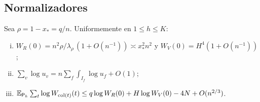 \subsection{Normalizadores}

\begin{lema}\label{lem:normalizadores}
Sea $\rho=1-x_*=q/n$. Uniformemente en $1\le h\le K$:
\begin{enumerate}[(i)]
\item $W_R(0)=n^2\rho/\lambda_\rho\,(1+O(n^{-1}))\asymp x_*^2n^2$ y $W_V(0)=H^4(1+O(n^{-1}))$;
\item $\sum_v\log u_v=n\sum_f\int_{I_f}\log u_f+O(1)$;
\item $\mathbb{E}_{\mathsf{P}_h}\sum_t\log W_{\mathrm{col}(t)}(t)\le q\log W_R(0)+H\log W_V(0)-4N+O(n^{2/3})$.
\end{enumerate}
\end{lema}

